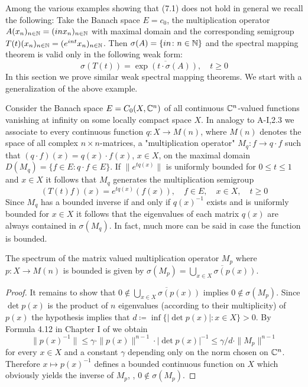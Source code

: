 Among the various examples showing that (7.1) does not hold in general we recall the following:
Take the Banach space $E = c_{0}$, the multiplication operator $A(x_{n})_{n\in\mathbb{N}} = (inx_{n})_{n\in\mathbb{N}}$ with maximal domain and the corresponding semigroup $T(t)(x_{n})_{n\in\mathbb{N}} = (e^{int}x_{n})_{n\in\mathbb{N}}$.
Then $\sigma(A) = \{in \colon n \in \mathbb{N}\}$ and the spectral mapping theorem is valid only in the following weak form:
\begin{equation}\label{eq:a3-7.2}
\sigma(T(t)) = \overline{\exp(t\cdot\sigma(A))}, \quad t \geq 0
\end{equation}
In this section we prove similar weak spectral mapping theorems.
We start with a generalization of the above example.

Consider the Banach space $E = C_{0}(X,\mathbb{C}^{n})$ of all continuous $\mathbb{C}^{n}$-valued functions vanishing at infinity on some locally compact space $X$.
In analogy to A-I,2.3 we associate to every continuous function $q \colon X \to M(n)$, where $M(n)$ denotes the space of all complex $n\times n$-matrices, a "multiplication operator" $M_{q} \colon f \to q\cdot f$ such that $(q\cdot f)(x) = q(x)\cdot f(x)$, $x \in X$, on the maximal domain $D(M_{q}) = \{f \in E \colon q\cdot f \in E\}$.
If $\|e^{tq(x)}\|$ is uniformly bounded for $0 \leq t \leq 1$ and $x \in X$ it follows that $M_{q}$ generates the multiplication semigroup
\[
(T(t)f)(x) = e^{tq(x)}(f(x)), \quad f \in E, \quad x \in X, \quad t \geq 0
\]
Since $M_{q}$ has a bounded inverse if and only if $q(x)^{-1}$ exists and is uniformly bounded for $x \in X$ it follows that the eigenvalues of each matrix $q(x)$ are always contained in $\sigma(M_{q})$.
In fact, much more can be said in case the function is bounded.
\begin{lemma}\label{lem:a3-6.1}
The spectrum of the matrix valued multiplication operator $M_{p}$ where $p \colon X \to M(n)$ is bounded is given by $\sigma(M_{p}) = \overline{\bigcup_{x\in X} \sigma(p(x))}$.
\end{lemma}
\begin{proof}
It remains to show that $0 \notin \overline{\bigcup_{x\in X} \sigma(p(x))}$ implies $0 \notin \sigma(M_{p})$.
Since $\det p(x)$ is the product of $n$ eigenvalues (according to their multiplicity) of $p(x)$ the hypothesis implies that $d \coloneqq \inf\{|\det p(x)| \colon x \in X\} > 0$.
By Formula 4.12 in Chapter I of \citet{kato:1966} we obtain
\[
\|p(x)^{-1}\| \leq \gamma \cdot \|p(x)\|^{n-1} \cdot |\det p(x)|^{-1} \leq \gamma/d \cdot \|M_{p}\|^{n-1}
\]
for every $x \in X$ and a constant $\gamma$ depending only on the norm chosen on $\mathbb{C}^{n}$.
Therefore $x \mapsto p(x)^{-1}$ defines a bounded continuous function on $X$ which obviously yields the inverse of $M_{p}$, \ie, $0 \notin \sigma(M_{p})$.
\end{proof}

